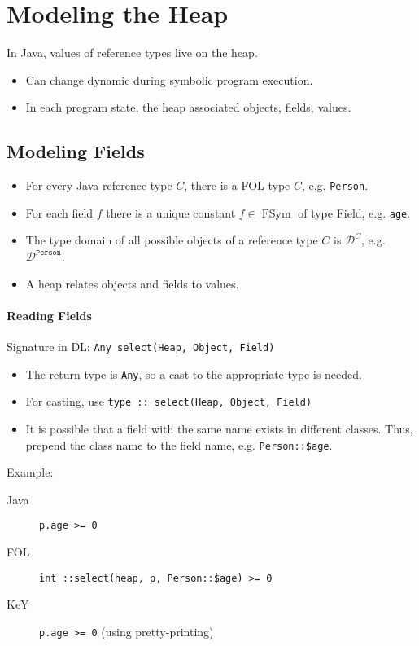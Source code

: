 \documentclass[a4paper, 11pt, accentcolor = tud3b]{tudreport}
\DeclareMathOperator{\FSym}{FSym}
\begin{document}
		\section{Modeling the Heap}
			In Java, values of reference types live on the heap.
			\begin{itemize}
				\item Can change dynamic during symbolic program execution.
				\item In each program state, the heap associated objects, fields, values.
			\end{itemize}
			
			\subsection{Modeling Fields}
				\begin{itemize}
					\item For every Java reference type \(C\), there is a FOL type \(C\), e.g. \texttt{Person}.
					\item For each field \(f\) there is a unique constant \( f \in \FSym \) of type Field, e.g. \texttt{age}.
					\item The type domain of all possible objects of a reference type \(C\) is \( \mathcal{D}^C \), e.g. \( \mathcal{D}^\texttt{Person} \).
					\item A heap relates objects and fields to values.
				\end{itemize}
				
				\paragraph{Reading Fields}
					Signature in DL: \texttt{Any select(Heap, Object, Field)}
					\begin{itemize}
						\item The return type is \texttt{Any}, so a cast to the appropriate type is needed.
						\item For casting, use \texttt{type :: select(Heap, Object, Field)}
						\item It is possible that a field with the same name exists in different classes. Thus, prepend the class name to the field name, e.g. \texttt{Person::\$age}.
					\end{itemize}
					
					Example:
					\begin{description}
						\item[Java] \texttt{p.age >= 0}
						\item[FOL]  \texttt{int ::select(heap, p, Person::\$age) >= 0}
						\item[KeY]  \texttt{p.age >= 0} (using pretty-printing)
					\end{description}
				
\end{document}
